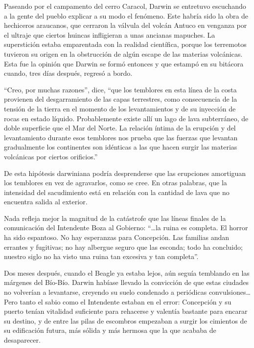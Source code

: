 \documentclass[10pt,twoside,openright]{memoir}
\begin{document}
Paseando por el campamento del cerro Caracol, Darwin se entretuvo
escuchando a la gente del pueblo explicar a su modo el fenómeno. Este
habría sido la obra de hechiceros araucanos, que cerraron la válvula del
volcán Antuco en venganza por el ultraje que ciertos huincas infligieran
a unas ancianas mapuches. La superstición estaba emparentada con la
realidad científica, porque los terremotos tuvieron su origen en la
obstrucción de algún escape de las materias volcánicas. Esta fue la
opinión que Darwin se formó entonces y que estampó en su bitácora
cuando, tres días después, regresó a bordo.

``Creo, por muchas razones'', dice, ``que los temblores en esta línea de la
costa provienen del desgarramiento de las capas terrestres, como
consecuencia de la tensión de la tierra en el momento de los
levantamientos y de su inyección de rocas en estado líquido.
Probablemente existe allí un lago de lava subterráneo, de doble
superficie que el Mar del Norte. La relación íntima de la erupción y del
levantamiento durante esos temblores nos prueba que las fuerzas que
levantan gradualmente los continentes son idénticas a las que hacen
surgir las materias volcánicas por ciertos orificios.''

De esta hipótesis darwiniana podría desprenderse que las erupciones
amortiguan los temblores en vez de agravarlos, como se cree. En otras
palabras, que la intensidad del sacudimiento está en relación con la
cantidad de lava que no encuentra salida al exterior.

Nada refleja mejor la magnitud de la catástrofe que las líneas finales
de la comunicación del Intendente Boza al Gobierno: ``\ldots{}la ruina
es completa. El horror ha sido espantoso. No hay esperanzas para
Concepción. Las familias andan errantes y fugitivas; no hay albergue
seguro que las esconda; todo ha concluido; nuestro siglo no ha visto una
ruina tan excesiva y tan completa''.

Dos meses después, cuando el Beagle ya estaba lejos, aún seguía
temblando en las márgenes del Bío-Bío. Darwin habíase llevado la
convicción de que estas ciudades no volverían a levantarse, creyendo su
suelo condenado a periódicas convulsiones\ldots Pero tanto el sabio como el
Intendente estaban en el error: Concepción y su puerto tenían vitalidad
suficiente para rehacerse y valentía bastante para encarar su destino, y
de entre las pilas de escombros empezaban a surgir los cimientos de su
edificación futura, más sólida y más hermosa que la que acababa de
desaparecer.
\end{document}
